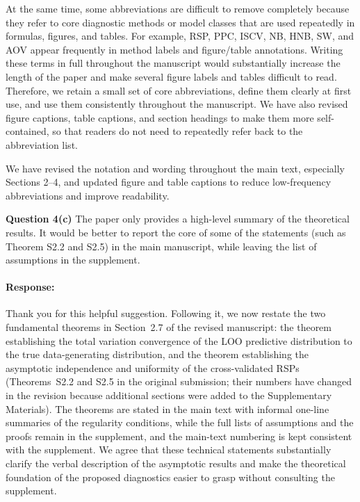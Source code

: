 \documentclass[11pt]{article}
\newcommand*{\mybox}[2]{%
  \par\medskip\noindent
  \colorbox{#1!30}{\parbox{.98\linewidth}{#2}}%
  \par\medskip
}
\begin{document}
At the same time, some abbreviations are difficult to remove completely because they refer to core diagnostic methods or model classes that are used repeatedly in formulas, figures, and tables. For example, RSP, PPC, ISCV, NB, HNB, SW, and AOV appear frequently in method labels and figure/table annotations. Writing these terms in full throughout the manuscript would substantially increase the length of the paper and make several figure labels and tables difficult to read. Therefore, we retain a small set of core abbreviations, define them clearly at first use, and use them consistently throughout the manuscript. We have also revised figure captions, table captions, and section headings to make them more self-contained, so that readers do not need to repeatedly refer back to the abbreviation list.

We have revised the notation and wording throughout the main text, especially Sections 2--4, and updated figure and table captions to reduce low-frequency abbreviations and improve readability.

\medskip

\mybox{gray}{\textbf{Question 4(c)} The paper only provides a high-level summary of the theoretical results. It would be better to report the core of some of the statements (such as Theorem S2.2 and S2.5) in the main manuscript, while leaving the list of assumptions in the supplement.}

\paragraph{Response:}
Thank you for this helpful suggestion. Following it, we now restate the two fundamental theorems in Section~2.7 of the revised manuscript: the theorem establishing the total variation convergence of the LOO predictive distribution to the true data-generating distribution, and the theorem establishing the asymptotic independence and uniformity of the cross-validated RSPs (Theorems~S2.2 and S2.5 in the original submission; their numbers have changed in the revision because additional sections were added to the Supplementary Materials). The theorems are stated in the main text with informal one-line summaries of the regularity conditions, while the full lists of assumptions and the proofs remain in the supplement, and the main-text numbering is kept consistent with the supplement. We agree that these technical statements substantially clarify the verbal description of the asymptotic results and make the theoretical foundation of the proposed diagnostics easier to grasp without consulting the supplement.

\setlength{\bibsep}{0.2em}


\end{document}

